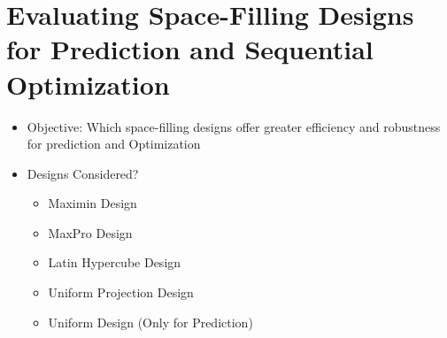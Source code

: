 \documentclass{beamer}
\begin{document}

\section{Evaluating Space-Filling Designs for Prediction and Sequential Optimization}
\begin{frame}
\begin{itemize}
  \item Objective:  Which space-filling designs offer greater efficiency and robustness for prediction and Optimization
  \item Designs Considered?
  \begin{itemize}
    \item Maximin Design
    \item MaxPro Design
    \item Latin Hypercube Design
    \item Uniform Projection Design
    \item Uniform Design (Only for Prediction)
  \end{itemize}
\end{itemize}
\end{frame}
\end{document}

